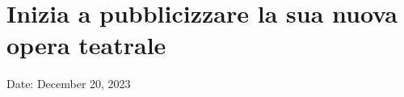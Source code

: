 \section{Inizia a pubblicizzare la sua nuova opera
teatrale}\label{inizia-a-pubblicizzare-la-sua-nuova-opera-teatrale}

Date: December 20, 2023
